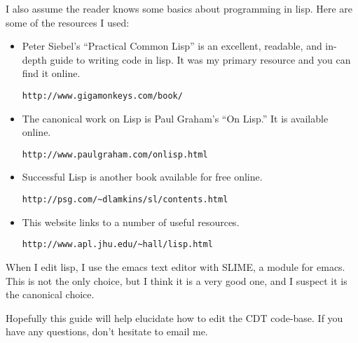\message{ !name(programmers_guide.tex)}\documentclass[12pt]{article}
\begin{document}
I also assume the reader knows some basics about programming in
lisp. Here are some of the resources I used:
\begin{itemize}
\item Peter Siebel's ``Practical Common Lisp'' is an excellent,
  readable, and in-depth guide to writing code in lisp. It was my
  primary resource and you can find it online.
  \begin{verbatim}
http://www.gigamonkeys.com/book/
\end{verbatim}
\item The canonical work on Lisp is Paul Graham's ``On Lisp.'' It is available online.
\begin{verbatim}
http://www.paulgraham.com/onlisp.html
\end{verbatim}
\item Successful Lisp is another book available for free online.
\begin{verbatim}
http://psg.com/~dlamkins/sl/contents.html
\end{verbatim}
\item This website links to a number of useful resources.
  \begin{verbatim}
http://www.apl.jhu.edu/~hall/lisp.html
\end{verbatim}
\end{itemize}
When I edit lisp, I use the emacs text editor with SLIME, a module for
emacs. This is not the only choice, but I think it is a very good one,
and I suspect it is the canonical choice.

Hopefully this guide will help elucidate how to edit the CDT
code-base. If you have any questions, don't hesitate to email me.
\end{document}
